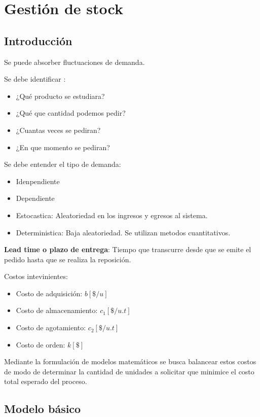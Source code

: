 \documentclass{article}
\begin{document}
\newpage
\section{Gestión de stock}

\subsection{Introducción}

Se puede absorber fluctuaciones de demanda.

Se debe identificar :
\begin{itemize}
    \item ¿Qué producto se estudiara?
    \item ¿Qué que cantidad podemos pedir?
    \item ¿Cuantas veces se pediran?
    \item ¿En que momento se pediran?
\end{itemize}

Se debe entender el tipo de demanda:

\begin{itemize}
    \item Idenpendiente
    \item Dependiente
    \item Estocastica: Aleatoriedad en los ingresos y egresos al sistema.
    \item Deterministica: Baja aleatoriedad. Se utilizan metodos cuantitativos.
\end{itemize}

\textbf{Lead time o plazo de entrega}: Tiempo que transcurre desde que se emite el pedido hasta que se realiza la reposición.

Costos intevinientes:

\begin{itemize}
    \item Costo de adquisición: \(b[\$/u]\)
    \item Costo de almacenamiento: \(c_1[\$/u.t]\)
    \item Costo de agotamiento: \(c_2[\$/u.t]\)
    \item Costo de orden: \(k[\$]\)
\end{itemize}

Mediante la formulación de modelos matemáticos se busca balancear estos costos de modo 
de determinar la cantidad de unidades a solicitar que minimice el costo total esperado del proceso.

\subsection{Modelo básico}
\end{document}
